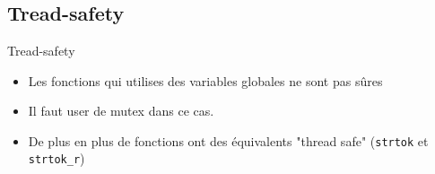\section{\sectitle}
\begin{frame}[containsverbatim]{\sectitle}
    \def\subsectitle{Tread-safety}
    \subsection{\subsectitle}
    \begin{block}{\subsectitle}
        \begin{itemize}
            \item Les fonctions qui utilises des variables globales ne sont pas
                sûres
            \item Il faut user de mutex dans ce cas.
            \item De plus en plus de fonctions ont des équivalents "thread safe"
                (\verb+strtok+ et \verb+strtok_r+)
        \end{itemize}
    \end{block}
\end{frame}


\def\sectitle{Threads en Java}
